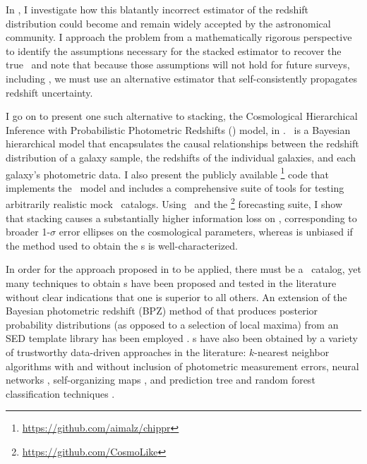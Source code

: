 In , I investigate how this blatantly incorrect estimator of the redshift distribution could become and remain widely accepted by the astronomical community.
I approach the problem from a mathematically rigorous perspective to identify the assumptions necessary for the stacked estimator to recover the true \Nz\ and note that because those assumptions will not hold for future surveys, including \lsst, we must use an alternative estimator that self-consistently propagates redshift uncertainty.

I go on to present one such alternative to stacking, the Cosmological Hierarchical Inference with Probabilistic Photometric Redshifts (\Chippr) model, in .
\Chippr\ is a Bayesian hierarchical model that encapsulates the causal relationships between the redshift distribution of a galaxy sample, the redshifts of the individual galaxies, and each galaxy's photometric data.
I also present the publicly available \chippr\footnote{\url{https://github.com/aimalz/chippr}} code that implements the \Chippr\ model and includes a comprehensive suite of tools for testing arbitrarily realistic mock \pzpdf\ catalogs.
Using \chippr\ and the \cosmolike\footnote{\url{https://github.com/CosmoLike}} forecasting suite, I show that stacking causes a substantially higher information loss on \nz, corresponding to broader 1-$\sigma$ error ellipses on the cosmological parameters, whereas \chippr is unbiased if the method used to obtain the \pzpdf s is well-characterized.

In order for the approach proposed in  to be applied, there must be a \pzpdf\ catalog, yet many techniques to obtain \pzpdf s have been proposed and tested in the literature without clear indications that one is superior to all others.  
An extension of the Bayesian photometric redshift (BPZ) method of \citet{Benitez2000} that produces posterior probability distributions (as opposed to a selection of local maxima) from an SED template library has been employed \citep{Hildebrandt2012, Kelly2014, Lopez-Sanjuan2015}.  
\Pzpdf s have also been obtained by a variety of trustworthy data-driven approaches in the literature: $k$-nearest neighbor algorithms with \citep{Ball2008} and without \citep{Sheldon2012} inclusion of photometric measurement errors, neural networks \citep{Bonnett2015a}, self-organizing maps \citep{CarrascoKind2014a}, and prediction tree and random forest classification techniques \citep{Carliles2010, CarrascoKind2013}.  

